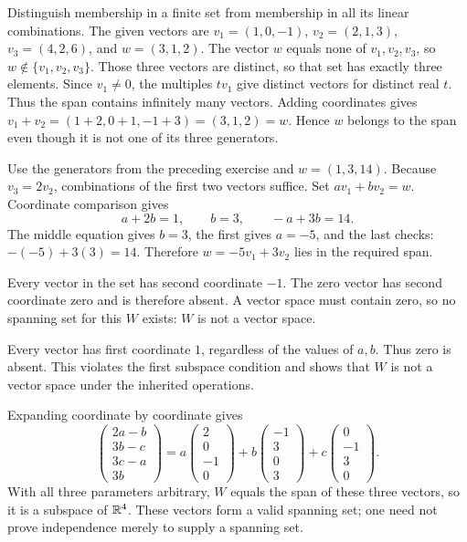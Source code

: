 \goal Distinguish membership in a finite set from membership in all its linear combinations.
The given vectors are $v_1=(1,0,-1)$, $v_2=(2,1,3)$, $v_3=(4,2,6)$,
and $w=(3,1,2)$.
The vector $w$ equals none of $v_1,v_2,v_3$, so $w\notin\{v_1,v_2,v_3\}$.
Those three vectors are distinct, so that set has exactly three elements.
Since $v_1\ne0$, the multiples $tv_1$ give distinct vectors for distinct real
$t$. Thus the span contains infinitely many vectors.
Adding coordinates gives $v_1+v_2=(1+2,0+1,-1+3)=(3,1,2)=w$.
Hence $w$ belongs to the span even though it is not one of its three generators.

Use the generators from the preceding exercise and $w=(1,3,14)$.
Because $v_3=2v_2$, combinations of the first two vectors suffice.
Set $av_1+bv_2=w$. Coordinate comparison gives
\[
 a+2b=1,\qquad b=3,\qquad -a+3b=14.
\]
The middle equation gives $b=3$, the first gives $a=-5$, and the last checks:
$-(-5)+3(3)=14$. Therefore $w=-5v_1+3v_2$ lies in the required span.

Every vector in the set has second coordinate $-1$. The zero vector has
second coordinate zero and is therefore absent. A vector space must contain
zero, so no spanning set for this $W$ exists: $W$ is not a vector space.

Every vector has first coordinate $1$, regardless of the values of $a,b$.
Thus zero is absent. This violates the first subspace condition and shows that
$W$ is not a vector space under the inherited operations.

Expanding coordinate by coordinate gives
\[
 \begin{pmatrix}2a-b\\3b-c\\3c-a\\3b\end{pmatrix}
 =a\begin{pmatrix}2\\0\\-1\\0\end{pmatrix}
 +b\begin{pmatrix}-1\\3\\0\\3\end{pmatrix}
 +c\begin{pmatrix}0\\-1\\3\\0\end{pmatrix}.
\]
With all three parameters arbitrary, $W$ equals the span of these three
vectors, so it is a subspace of $\mathbb{R}^4$. These vectors form a valid spanning
set; one need not prove independence merely to supply a spanning set.


